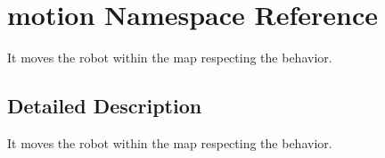\hypertarget{namespacemotion}{}\section{motion Namespace Reference}
\label{namespacemotion}


It moves the robot within the map respecting the behavior.  




\subsection{Detailed Description}
It moves the robot within the map respecting the behavior. 